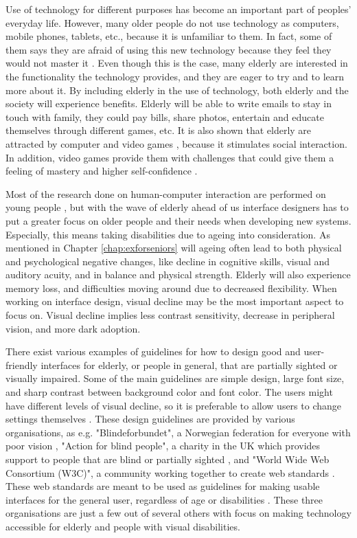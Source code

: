 Use of technology for different purposes has become an important part of peoples' everyday life. However, many older people do not use technology as computers, mobile phones, tablets, etc., because it is unfamiliar to them. In fact, some of them says they are afraid of using this new technology because they feel they would not master it \cite{mmi}. Even though this is the case, many elderly are interested in the functionality the technology provides, and they are eager to try and to learn more about it. By including elderly in the use of technology, both elderly and the society will experience benefits. Elderly will be able to write emails to stay in touch with family, they could pay bills, share photos, entertain and educate themselves through different games, etc. It is also shown that elderly are attracted by computer and video games \cite{mmi} \cite{ijsselsteijn2007digital}, because it stimulates social interaction. In addition, video games provide them with challenges that could give them a feeling of mastery and higher self-confidence \cite{mmi}. 

Most of the research done on human-computer interaction are performed on young people \cite{dickinson2007methods}, but with the wave of elderly ahead of us interface designers has to put a greater focus on older people and their needs when developing new systems. Especially, this means taking disabilities due to ageing into consideration. As mentioned in Chapter \ref{chap:exforseniors} will ageing often lead to both physical and psychological negative changes, like decline in cognitive skills, visual and auditory acuity, and in balance and physical strength. Elderly will also experience memory loss, and difficulties moving around due to decreased flexibility. When working on interface design, visual decline may be the most important aspect to focus on. Visual decline implies less contrast sensitivity, decrease in peripheral vision, and more dark adoption. 

There exist various examples of guidelines for how to design good and user-friendly interfaces for elderly, or people in general, that are partially sighted or visually impaired. Some of the main guidelines are simple design, large font size, and sharp contrast between background color and font color. The users might have different levels of visual decline, so it is preferable to allow users to change settings themselves \cite{blindeforbundetTekst} \cite{actionforblindpeopleTekst} \cite{w3cTekst}. These design guidelines are provided by various organisations, as e.g. "Blindeforbundet", a Norwegian federation for everyone with poor vision \cite{blindeforbundet}, "Action for blind people", a charity in the UK which provides support to people that are blind or partially sighted \cite{actionforblindpeople}, and "World Wide Web Consortium (W3C)", a community working together to create web standards \cite{w3c}. These web standards are meant to be used as guidelines for making usable interfaces for the general user, regardless of age or disabilities \cite{w3cTekst}. These three organisations are just a few out of several others with focus on making technology accessible for elderly and people with visual disabilities. 

